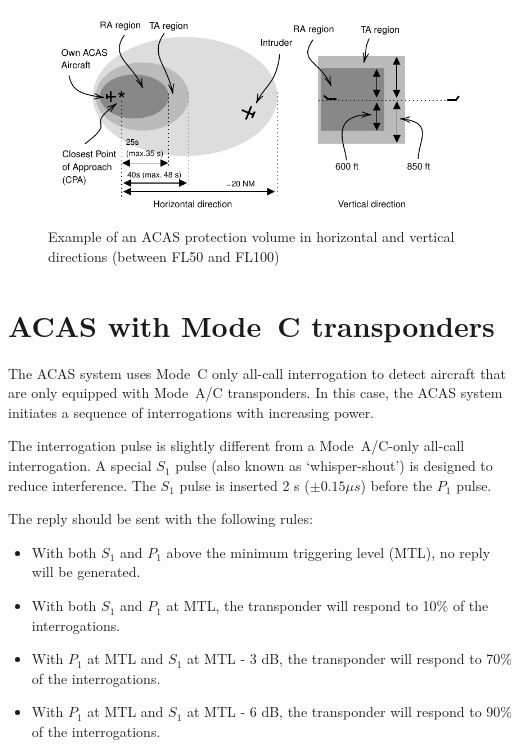 \begin{figure}[ht]
\centering
\includegraphics[scale=0.9]{figures/mode_s/acas_regions.pdf}
\caption{Example of an ACAS protection volume in horizontal and vertical directions (between FL50 and FL100)}
\label{fig:acas_regions}
\end{figure}




\section{ACAS with Mode~C transponders}

The ACAS system uses Mode~C only all-call interrogation to detect aircraft that are only equipped with Mode~A/C transponders. In this case, the ACAS system initiates a sequence of interrogations with increasing power.

The interrogation pulse is slightly different from a Mode~A/C-only all-call interrogation. A special $S_1$ pulse (also known as `whisper-shout') is designed to reduce interference. The $S_1$ pulse is inserted 2  {\textmu}s ($\pm 0.15 \mu s$) before the $P_1$ pulse.

The reply should be sent with the following rules:

\begin{itemize}
  \item With both $S_1$ and $P_1$ above the minimum triggering level (MTL), no reply will be generated.
  \item With both $S_1$ and $P_1$ at MTL, the transponder will respond to 10\% of the interrogations.
  \item With $P_1$ at MTL and $S_1$ at MTL - 3 dB, the transponder will respond to 70\% of the interrogations.
  \item With $P_1$ at MTL and $S_1$ at MTL - 6 dB, the transponder will respond to 90\% of the interrogations.
\end{itemize}


